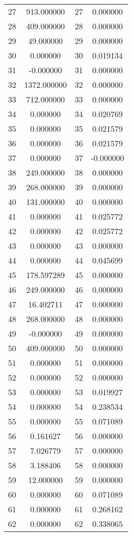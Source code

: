 \documentclass[12pt]{article}
\begin{document}
\begin{longtable}{@{}cccc@{}}
27 & 913.000000 & 27 & 0.000000 \\
28 & 409.000000 & 28 & 0.000000 \\
29 & 49.000000 & 29 & 0.000000 \\
30 & 0.000000 & 30 & 0.019134 \\
31 & -0.000000 & 31 & 0.000000 \\
32 & 1372.000000 & 32 & 0.000000 \\
33 & 712.000000 & 33 & 0.000000 \\
34 & 0.000000 & 34 & 0.020769 \\
35 & 0.000000 & 35 & 0.021579 \\
36 & 0.000000 & 36 & 0.021579 \\
37 & 0.000000 & 37 & -0.000000 \\
38 & 249.000000 & 38 & 0.000000 \\
39 & 268.000000 & 39 & 0.000000 \\
40 & 131.000000 & 40 & 0.000000 \\
41 & 0.000000 & 41 & 0.025772 \\
42 & 0.000000 & 42 & 0.025772 \\
43 & 0.000000 & 43 & 0.000000 \\
44 & 0.000000 & 44 & 0.045699 \\
45 & 178.597289 & 45 & 0.000000 \\
46 & 249.000000 & 46 & 0.000000 \\
47 & 16.402711 & 47 & 0.000000 \\
48 & 268.000000 & 48 & 0.000000 \\
49 & -0.000000 & 49 & 0.000000 \\
50 & 409.000000 & 50 & 0.000000 \\
51 & 0.000000 & 51 & 0.000000 \\
52 & 0.000000 & 52 & 0.000000 \\
53 & 0.000000 & 53 & 0.019927 \\
54 & 0.000000 & 54 & 0.238534 \\
55 & 0.000000 & 55 & 0.071089 \\
56 & 0.161627 & 56 & 0.000000 \\
57 & 7.026779 & 57 & 0.000000 \\
58 & 3.188406 & 58 & 0.000000 \\
59 & 12.000000 & 59 & 0.000000 \\
60 & 0.000000 & 60 & 0.071089 \\
61 & 0.000000 & 61 & 0.268162 \\
62 & 0.000000 & 62 & 0.338065 \\

\end{longtable}
\end{document}
